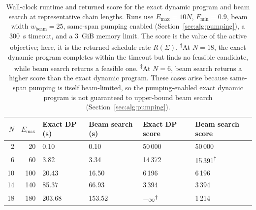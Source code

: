 \begin{table}[ht]
    \centering
    \small
    \begin{tabular}{rrllll}
        \toprule
        $N$ & $E_{\max}$ & Exact DP (s) & Beam search (s) & Exact DP score & Beam search score \\
        \midrule
        2  & 20  & 0.10 & 0.10 & 50\,000 & 50\,000 \\
        6  & 60  & 3.82 & 3.34 & 14\,372 & 15\,391\textsuperscript{$\ddagger$} \\
        10 & 100 & 20.43 & 16.50 & 6\,196 & 6\,196 \\
        14 & 140 & 85.37 & 66.93 & 3\,394 & 3\,394 \\
        18 & 180 & 203.68 & 153.52 & $-\infty$\textsuperscript{$\dagger$} & 1\,214 \\
        \bottomrule
    \end{tabular}
    \caption[Runtime benchmarks: exact DP vs.\ beam search]{Wall-clock runtime and returned score for the exact dynamic program and beam search at representative chain lengths. Runs use $E_{\max}=10N$, $F_{\min}=0.9$, beam width $w_{\mathrm{beam}}=25$, same-span pumping enabled (Section~\ref{sec:alg:pumping}), a 300~s timeout, and a 3~GiB memory limit. The score is the value of the active objective; here, it is the returned schedule rate $R(\Sigma)$. \textsuperscript{$\dagger$}At $N=18$, the exact dynamic program completes within the timeout but finds no feasible candidate, while beam search returns a feasible one. \textsuperscript{$\ddagger$}At $N=6$, beam search returns a higher score than the exact dynamic program. These cases arise because same-span pumping is itself beam-limited, so the pumping-enabled exact dynamic program is not guaranteed to upper-bound beam search (Section~\ref{sec:alg:pumping}).}
    \label{tab:benchmarks}
\end{table}